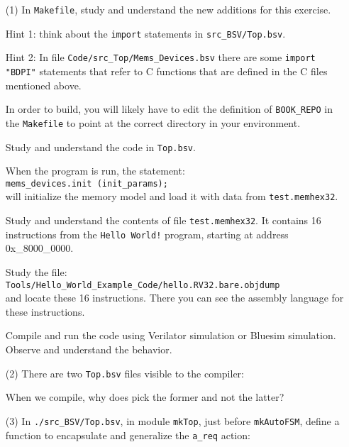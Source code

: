 \begin{itemize}

\item[(1)] In \verb|Makefile|, study and understand the new additions
    for this exercise.

    Hint 1: think about the \verb|import| statements in \verb|src_BSV/Top.bsv|.

    Hint 2: In file \verb|Code/src_Top/Mems_Devices.bsv| there are
        some \verb|import "BDPI"| statements that refer to C functions
        that are defined in the C files mentioned above.

    In order to build, you will likely have to edit the definition of
    \verb|BOOK_REPO| in the \verb|Makefile| to point at the correct
    directory in your environment.

    Study and understand the code in \verb|Top.bsv|.

    When the program is run, the statement: \\
    \hmm \verb|mems_devices.init (init_params);| \\
    will initialize the memory model and load it with data from
    \verb|test.memhex32|.

    Study and understand the contents of file \verb|test.memhex32|.
    It contains 16 instructions from the \verb|Hello World!| program,
    starting at address 0x\_8000\_0000.

    Study the file: \\
    \hmm \verb|Tools/Hello_World_Example_Code/hello.RV32.bare.objdump| \\
    and locate these 16 instructions. There you can see the assembly
    language for these instructions.

    Compile and run the code using Verilator simulation or Bluesim
    simulation.  Observe and understand the behavior.

\item[(2)] There are two \verb|Top.bsv| files visible to the {\bsc} compiler:
    When we compile, why does {\bsc} pick the former and not the latter?

\item[(3)] In \verb|./src_BSV/Top.bsv|, in module \verb|mkTop|, just
    before \verb|mkAutoFSM|, define a function to encapsulate and
    generalize the \verb|a_req| action:


\end{itemize}
